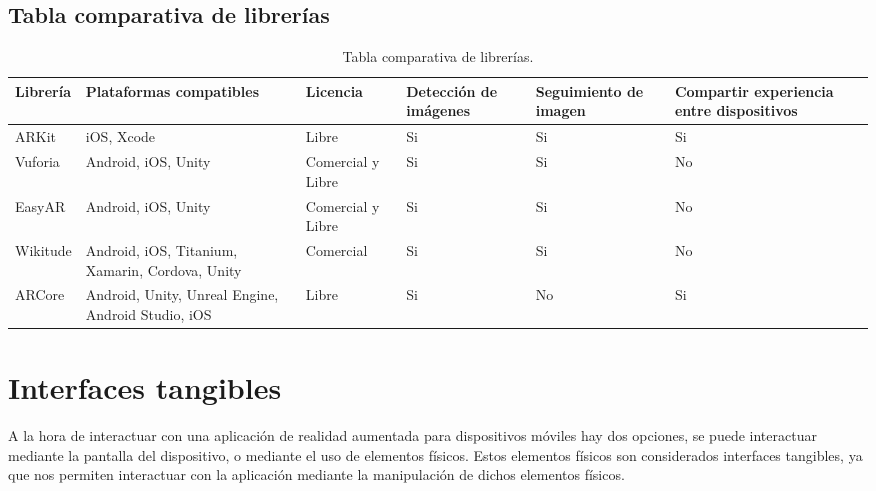 \subsection{Tabla comparativa de librerías}
\begin{table}[h]
  \begin{center}
    \begin{tabular}{|p{1.4cm}|p{2.2cm}|p{1.6cm}|p{2.2cm}|p{2cm}|p{2.7cm}|}

      \hline
        \rowcolor{Gray} \textbf{Librería}
        & \textbf{Plataformas compatibles}
        & \textbf{Licencia}
        & \textbf{Detección de imágenes}
        & \textbf{Seguimiento de imagen}
        & \textbf{Compartir experiencia entre dispositivos}\\

      \hline
      ARKit
      & iOS, Xcode
      & Libre
      & Si
      & Si
      & Si\\

      \hline
      Vuforia
      & Android, iOS, Unity
      & Comercial y Libre
      & Si
      & Si
      & No\\

      \hline
      EasyAR
      & Android, iOS, Unity
      & Comercial y Libre
      & Si
      & Si
      & No\\

      \hline
      Wikitude
      & Android, iOS, Titanium, Xamarin, Cordova, Unity
      & Comercial
      & Si
      & Si
      & No\\

      \hline
      ARCore
      & Android, Unity, Unreal Engine, Android Studio, iOS
      & Libre
      & Si
      & No
      & Si\\

      \hline

    \end{tabular}

    \caption{Tabla comparativa de librerías.}
    \label{tabla-librerias}

  \end{center}
\end{table}

\section{Interfaces tangibles}
A la hora de interactuar con una aplicación de realidad aumentada para dispositivos móviles hay dos opciones, se puede interactuar mediante la pantalla del dispositivo, o mediante el uso de elementos físicos. Estos elementos físicos son considerados interfaces tangibles, ya que nos permiten interactuar con la aplicación mediante la manipulación de dichos elementos físicos.\\

